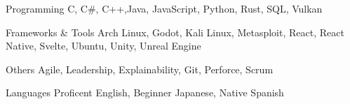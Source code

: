 

\begin{cvskills}

  \cvskill
    {Programming} %
    {C, C\#, C++,Java, JavaScript, Python, Rust, SQL, Vulkan}

  \cvskill
    {Frameworks \& Tools} %
    {Arch Linux, Godot, Kali Linux, Metasploit, React, React Native, Svelte, Ubuntu, Unity, Unreal Engine} 

  \cvskill
    {Others} %
    {Agile, Leadership, Explainability, Git, Perforce, Scrum}

  \cvskill
    {Languages} %
    {Proficent English, Beginner Japanese, Native Spanish}

\end{cvskills}
